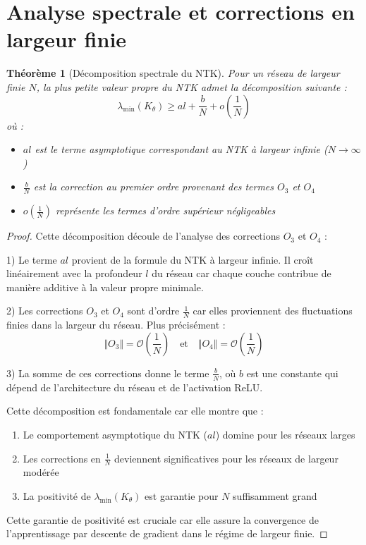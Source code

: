 \documentclass{article}
\newtheorem{proof}{Preuve}
\newtheorem{theorem}{Théorème}
\begin{document}
\section{Analyse spectrale et corrections en largeur finie}

\begin{theorem}[Décomposition spectrale du NTK]
Pour un réseau de largeur finie $N$, la plus petite valeur propre du NTK admet la décomposition suivante :
\[ \lambda_{\min}(K_\theta) \geq al + \frac{b}{N} + o(\frac{1}{N}) \]
où :
\begin{itemize}
\item $al$ est le terme asymptotique correspondant au NTK à largeur infinie ($N \to \infty$)
\item $\frac{b}{N}$ est la correction au premier ordre provenant des termes $O_3$ et $O_4$
\item $o(\frac{1}{N})$ représente les termes d'ordre supérieur négligeables
\end{itemize}
\end{theorem}

\begin{proof}
Cette décomposition découle de l'analyse des corrections $O_3$ et $O_4$ :

1) Le terme $al$ provient de la formule du NTK à largeur infinie. Il croît linéairement avec la profondeur $l$ du réseau car chaque couche contribue de manière additive à la valeur propre minimale.

2) Les corrections $O_3$ et $O_4$ sont d'ordre $\frac{1}{N}$ car elles proviennent des fluctuations finies dans la largeur du réseau. Plus précisément :
   \[ \Vert O_3 \Vert = \mathcal{O}(\frac{1}{N}) \quad \text{et} \quad \Vert O_4 \Vert = \mathcal{O}(\frac{1}{N}) \]

3) La somme de ces corrections donne le terme $\frac{b}{N}$, où $b$ est une constante qui dépend de l'architecture du réseau et de l'activation ReLU.

Cette décomposition est fondamentale car elle montre que :
\begin{enumerate}
\item Le comportement asymptotique du NTK ($al$) domine pour les réseaux larges
\item Les corrections en $\frac{1}{N}$ deviennent significatives pour les réseaux de largeur modérée
\item La positivité de $\lambda_{\min}(K_\theta)$ est garantie pour $N$ suffisamment grand
\end{enumerate}

Cette garantie de positivité est cruciale car elle assure la convergence de l'apprentissage par descente de gradient dans le régime de largeur finie.
\end{proof}
\end{document}
